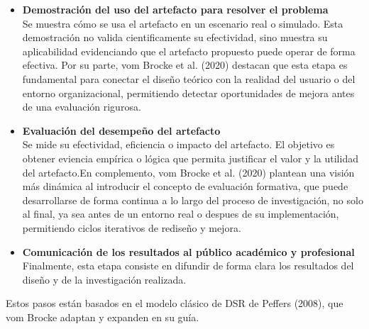 \begin{itemize}[align=left, label=--]
    \item \textbf{Demostración del uso del artefacto para resolver el problema}\\
    Se muestra cómo se usa el artefacto en un escenario real o simulado. Esta demostración no valida cientificamente su efectividad, sino muestra su aplicabilidad evidenciando que el artefacto propuesto puede operar de forma efectiva. 
    Por su parte, vom Brocke et al. (2020) destacan que esta etapa es fundamental para conectar el diseño teórico con la realidad del usuario o del entorno organizacional, permitiendo detectar oportunidades de mejora antes de una evaluación rigurosa.
    \item \textbf{Evaluación del desempeño del artefacto}\\
    Se mide su efectividad, eficiencia o impacto del artefacto. El objetivo es obtener eviencia empírica o lógica que permita justificar el valor y la utilidad del artefacto.En complemento, vom Brocke et al. (2020) plantean una visión más dinámica al introducir el concepto de evaluación formativa, que puede desarrollarse de forma continua a lo largo del proceso de investigación, no solo al final, ya sea antes de un entorno real o despues de su implementación,
    permitiendo ciclos iterativos de rediseño y mejora.
    \item \textbf{Comunicación de los resultados al público académico y profesional}\\
    Finalmente, esta etapa consiste en difundir de forma clara los resultados del diseño y de la investigación realizada.
\end{itemize}
Estos pasos están basados en el modelo clásico de DSR de Peffers (2008), que vom Brocke adaptan y expanden en su guía.


